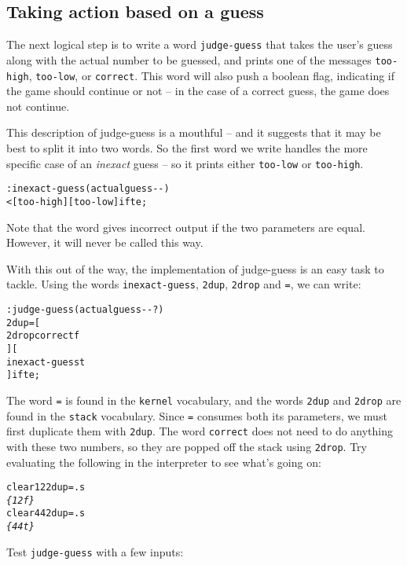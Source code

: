 \documentclass[english]{article}
\begin{document}
\subsection{Taking action based on a guess}

The next logical step is to write a word \texttt{judge-guess} that
takes the user's guess along with the actual number to be guessed,
and prints one of the messages \texttt{too-high}, \texttt{too-low},
or \texttt{correct}. This word will also push a boolean flag, indicating
if the game should continue or not -- in the case of a correct guess,
the game does not continue.

This description of judge-guess is a mouthful -- and it suggests that
it may be best to split it into two words. So the first word we write
handles the more specific case of an \emph{inexact} guess -- so it
prints either \texttt{too-low} or \texttt{too-high}.

\begin{alltt}
: inexact-guess ( actual guess -{}- )
     < {[} too-high {]} {[} too-low {]} ifte ;
\end{alltt}
Note that the word gives incorrect output if the two parameters are
equal. However, it will never be called this way.

With this out of the way, the implementation of judge-guess is an
easy task to tackle. Using the words \texttt{inexact-guess}, \texttt{2dup}, \texttt{2drop} and \texttt{=}, we can write:

\begin{alltt}
: judge-guess ( actual guess -{}- ? )
    2dup = {[}
        2drop correct f
    {]} {[}
        inexact-guess t
    {]} ifte ;
\end{alltt}

The word \texttt{=} is found in the \texttt{kernel} vocabulary, and the words \texttt{2dup} and \texttt{2drop} are found in the \texttt{stack} vocabulary. Since \texttt{=}
consumes both its parameters, we must first duplicate them with \texttt{2dup}. The word \texttt{correct} does not need to do anything with these two numbers, so they are popped off the stack using \texttt{2drop}. Try evaluating the following
in the interpreter to see what's going on:

\begin{alltt}
clear 1 2 2dup = .s
\emph{\{ 1 2 f \}}
clear 4 4 2dup = .s
\emph{\{ 4 4 t \}}
\end{alltt}

Test \texttt{judge-guess} with a few inputs:
\end{document}
